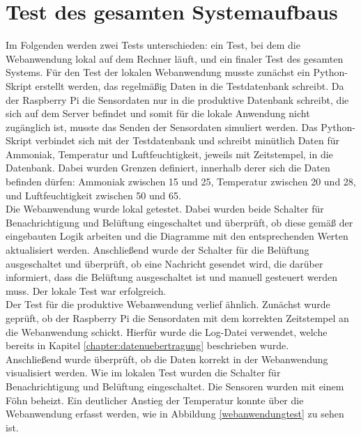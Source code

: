 \documentclass[conference]{IEEEtran}
\begin{document}
\section{Test des gesamten Systemaufbaus}
Im Folgenden werden zwei Tests unterschieden: ein Test, bei dem die Webanwendung lokal auf dem Rechner läuft, und ein finaler Test des gesamten Systems. Für den Test der lokalen Webanwendung musste zunächst ein Python-Skript erstellt werden, das regelmäßig Daten in die Testdatenbank schreibt. Da der Raspberry Pi die Sensordaten nur in die produktive Datenbank schreibt, die sich auf dem Server befindet und somit für die lokale Anwendung nicht zugänglich ist, musste das Senden der Sensordaten simuliert werden. Das Python-Skript verbindet sich mit der Testdatenbank und schreibt minütlich Daten für Ammoniak, Temperatur und Luftfeuchtigkeit, jeweils mit Zeitstempel, in die Datenbank. Dabei wurden Grenzen definiert, innerhalb derer sich die Daten befinden dürfen: Ammoniak zwischen 15 und 25, Temperatur zwischen 20 und 28, und Luftfeuchtigkeit zwischen 50 und 65. \\
Die Webanwendung wurde lokal getestet. Dabei wurden beide Schalter für Benachrichtigung und Belüftung eingeschaltet und überprüft, ob diese gemäß der eingebauten Logik arbeiten und die Diagramme mit den entsprechenden Werten aktualisiert werden. Anschließend wurde der Schalter für die Belüftung ausgeschaltet und überprüft, ob eine Nachricht gesendet wird, die darüber informiert, dass die Belüftung ausgeschaltet ist und manuell gesteuert werden muss. Der lokale Test war erfolgreich. \\
Der Test für die produktive Webanwendung verlief ähnlich. Zunächst wurde geprüft, ob der Raspberry Pi die Sensordaten mit dem korrekten Zeitstempel an die Webanwendung schickt. Hierfür wurde die Log-Datei verwendet, welche bereits in Kapitel \ref{chapter:datenuebertragung}
beschrieben wurde. \\
Anschließend wurde überprüft, ob die Daten korrekt in der Webanwendung visualisiert werden. Wie im lokalen Test wurden die Schalter für Benachrichtigung und Belüftung eingeschaltet. Die Sensoren wurden mit einem Föhn beheizt. Ein deutlicher Anstieg der Temperatur konnte über die Webanwendung erfasst werden, wie in Abbildung \ref{webanwendungtest} zu sehen ist. 
\end{document}
